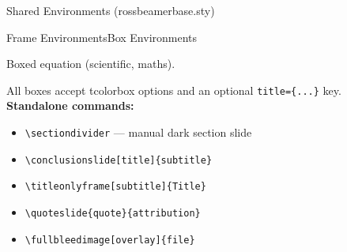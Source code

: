 \documentclass[palette=lancet]{rossbeamerscientific}
\newcommand{\cmd}[1]{\texttt{\color{rbAccent}\textbackslash #1}}
\newcommand{\env}[1]{\texttt{\color{rbSecondary}#1}}
\begin{document}
\begin{frame}{Shared Environments \normalfont\small(rossbeamerbase.sty)}
\begin{comparison}{Frame Environments}{Box Environments}
\begin{description}[leftmargin=0pt]
    \item[\env{eqbox}] Boxed equation (scientific, maths).
  \end{description}
  \vskip4pt
  All boxes accept tcolorbox options and an optional \texttt{title=\{...\}} key.
  \vskip4pt
  \textbf{Standalone commands:}
  \begin{itemize}\setlength\itemsep{0pt}
    \item \cmd{sectiondivider} --- manual dark section slide
    \item \cmd{conclusionslide[title]\{subtitle\}}
    \item \cmd{titleonlyframe[subtitle]\{Title\}}
    \item \cmd{quoteslide\{quote\}\{attribution\}}
    \item \cmd{fullbleedimage[overlay]\{file\}}
  \end{itemize}
\end{comparison}
\end{frame}
\end{document}
